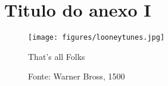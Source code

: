 \begin{anexosenv}
\label{attachments}

\chapter{Titulo do anexo I} \label{anexoA}

\begin{figure}[htb] 
    \centering
    \texttt{[image: figures/looneytunes.jpg]}
    \caption{That's all Folks}
    \label{fig_looneytunes}
    \caption*{Fonte: Warner Bross, 1500}
\end{figure}



\end{anexosenv}